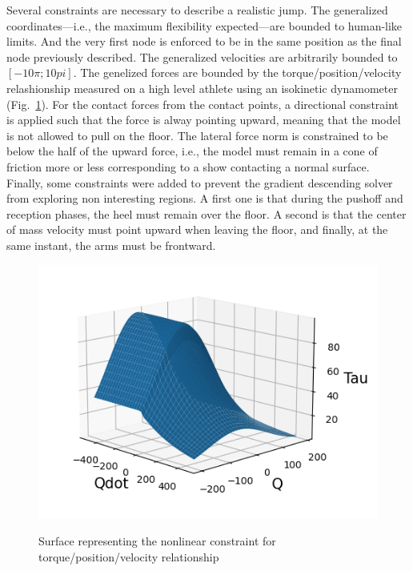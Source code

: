
Several constraints are necessary to describe a realistic jump.
The generalized coordinates---i.e., the maximum flexibility expected---are bounded to human-like limits.
And the very first node is enforced to be in the same position as the final node previously described. 
The generalized velocities are arbitrarily bounded to $[-10 \pi; 10 pi]$.
The genelized forces are bounded by the torque/position/velocity relashionship measured on a high level athlete using an isokinetic dynamometer (Fig.~\ref{fig:graph_force_vitesse_longueur}). 
For the contact forces from the contact points, a directional constraint is applied such that the force is alway pointing upward, meaning that the model is not allowed to pull on the floor. 
The lateral force norm is constrained to be below the half of the upward force, i.e., the model must remain in a cone of friction more or less corresponding to a show contacting a normal surface. 
Finally, some constraints were added to prevent the gradient descending solver from exploring non interesting regions. 
A first one is that during the pushoff and reception phases, the heel must remain over the floor.
A second is that the center of mass velocity must point upward when leaving the floor, and finally, at the same instant, the arms must be frontward. 

\begin{figure}[h!]
\includegraphics[width=\columnwidth]{figures/graph_force_vitesse_longueur.png}\\
\caption{Surface representing the nonlinear constraint for torque/position/velocity relationship}
\label{fig:graph_force_vitesse_longueur}
\end{figure}

